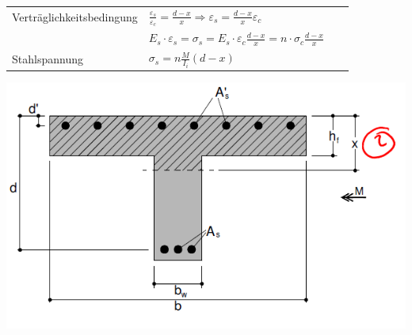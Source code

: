 \begin{landscape}
\begin{multicols}{3}
\begin{tabular}{p{0.4\linewidth}|p{0.6\linewidth}}
			\hspace*{0pt} Verträglichkeitsbedingung & $ \frac{\varepsilon_s}{\varepsilon_c} = \frac{d - x}{x}
			\Rightarrow \varepsilon_s = \frac{d - x}{x} \varepsilon_c $	 \\
			& $ E_s \cdot \varepsilon_s = \sigma_s = E_s \cdot \varepsilon_c \frac{d - x}{x} = n \cdot \sigma_c \frac{d - x}{x} $		\\
			
			Stahlspannung			& $ \sigma_s = n \frac{M}{I_i} (d - x) $ \\
			
		\end{tabular}
		
		
		\includegraphics[width=0.7\linewidth]{images/Risse4Plattenbalken.PNG}
		
		
	\end{multicols}
	
\end{landscape}



